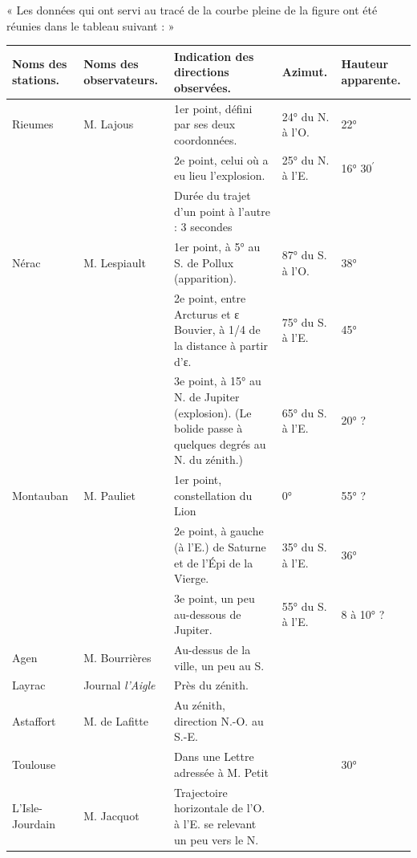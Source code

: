 \documentclass[a4paper, 11pt, oneside, polutonikogreek, french]{article}
\begin{document}
« Les données qui ont servi au tracé de la courbe pleine de la figure ont été réunies dans le tableau suivant : »
\begin{table}[H]
    \centering\footnotesize
    \begin{tabular}{|p{15mm}|p{15mm}|p{35mm}|p{13mm}|p{13mm}|}
    \hline
        Noms des stations. & Noms des observateurs. & Indication des directions observées. & Azimut. & Hauteur apparente. \\ \hline
        Rieumes & M. Lajous & 1er point, défini par ses deux coordonnées. & 24° du N. à l'O. & 22° \\ \hline
        ~ & ~ & 2e point, celui où a eu lieu l'explosion. & 25° du N. à l'E. & 16° 30$^{\prime}$ \\ \hline
        ~ & ~ & Durée du trajet d'un point à l'autre : 3 secondes & ~ & ~ \\ \hline
        Nérac & M. Lespiault & 1er point, à 5° au S. de Pollux (apparition). & 87° du S. à l'O. & 38° \\ \hline
        ~ & ~ & 2e point, entre Arcturus et ε Bouvier, à 1/4 de la distance à partir d'ε. & 75° du S. à l'E. & 45° \\ \hline
        ~ & ~ & 3e point, à 15° au N. de Jupiter (explosion). (Le bolide passe à quelques degrés au N. du zénith.) & 65° du S. à l'E. & 20° ? \\ \hline
        Montauban & M. Pauliet & 1er point, constellation du Lion & 0° & 55° ? \\ \hline
        ~ & ~ & 2e point, à gauche (à l'E.) de Saturne et de l'Épi de la Vierge. & 35° du S. à l'E. & 36° \\ \hline
        ~ & ~ & 3e point, un peu au-dessous de Jupiter. & 55° du S. à l'E. & 8 à 10° ? \\ \hline
        Agen & M. Bourrières & Au-dessus de la ville, un peu au S. & ~ & ~ \\ \hline
        Layrac & Journal \emph{l'Aigle} & Près du zénith. & ~ & ~ \\ \hline
        Astaffort & M. de Lafitte & Au zénith, direction N.-O. au S.-E. & ~ & ~ \\ \hline
        Toulouse & ~ & Dans une Lettre adressée à M. Petit & ~ & 30° \\ \hline
        L'Isle-Jourdain & M. Jacquot & Trajectoire horizontale de l'O. à l'E. se relevant un peu vers le N. & ~ & ~ \\ \hline
    \end{tabular}
\end{table}
\end{document}
